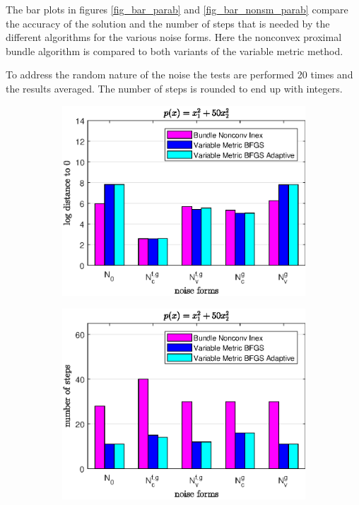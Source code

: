 The bar plots in figures \ref{fig_bar_parab} and \ref{fig_bar_nonsm_parab} compare the accuracy of the solution and the number of steps that is needed by the different algorithms for the various noise forms. Here the nonconvex proximal bundle algorithm is compared to both variants of the variable metric method.

To address the random nature of the noise the tests are performed 20 times and the results averaged. The number of steps is rounded to end up with integers.

\begin{figure}[ht]
	\begin{subfigure}[t]{0.49\textwidth}
		\includegraphics[width=\textwidth]{Pictures/Plots/accuracy_bar_parab_u_1-2.eps}
	\end{subfigure}%
	\hfill
	\begin{subfigure}[t]{0.49\textwidth}
			\includegraphics[width=\textwidth]{Pictures/Plots/steps_bar_parab_u_1-2.eps}

\end{subfigure}
\end{figure}
